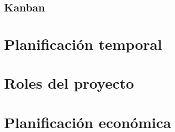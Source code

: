 \subsection{Kanban}

\section{Planificación temporal}\label{sec:planificacion_temporal}

\section{Roles del proyecto}\label{sec:roles_proyecto}

\section{Planificación económica}\label{sec:planificacion_economica}
